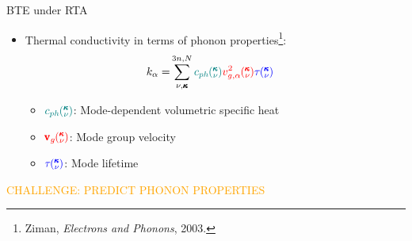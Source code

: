 \documentclass{beamer}
\newcommand{\kv}{\mspace{-4.0mu}\left(\mspace{-8.0mu}
\begin{smallmatrix}&\pmb{\kappa} \\&\nu\end{smallmatrix}
\mspace{-3.0mu}\right)}
\begin{document}
\begin{frame}{BTE under RTA}
\begin{itemize}
\item Thermal conductivity in terms of phonon properties\footnote{Ziman, \textit{Electrons and Phonons}, 2003.}:
\begin{equation*}\label{EQ:M:conductivity}
\begin{split}
k_{\mathbf{\alpha}}=&\sum_{\nu,\pmb{\kappa}}^{3n,N} \textcolor{teal}{c_{ph}\kv}
\textcolor{red}{v^{2}_{g,\mathbf{\alpha}}\kv} \textcolor{blue}{\tau\kv}
\end{split}
\end{equation*}
\begin{itemize}
\item $\textcolor{teal}{c_{ph}\kv}$: Mode-dependent volumetric specific heat
\item $\textcolor{red}{\pmb{\mathrm{v}}_{g}\kv}$: Mode group velocity
\item $\textcolor{blue}{\tau\kv}$: Mode lifetime
\end{itemize}

\end{itemize}
\textcolor{orange}{CHALLENGE: PREDICT PHONON PROPERTIES}\\
\end{frame}


\end{document}
